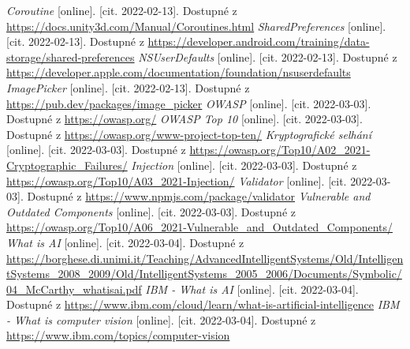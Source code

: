 \begin{thebibliography}{99}
     \textit{Coroutine} [online]. [cit. 2022-02-13]. Dostupné z \url{https://docs.unity3d.com/Manual/Coroutines.html}
     \textit{SharedPreferences} [online]. [cit. 2022-02-13]. Dostupné z \url{https://developer.android.com/training/data-storage/shared-preferences}
     \textit{NSUserDefaults} [online]. [cit. 2022-02-13]. Dostupné z \url{https://developer.apple.com/documentation/foundation/nsuserdefaults}
     \textit{ImagePicker} [online]. [cit. 2022-02-13]. Dostupné z \url{https://pub.dev/packages/image_picker}
     \textit{OWASP} [online]. [cit. 2022-03-03]. Dostupné z \url{https://owasp.org/}
     \textit{OWASP Top 10} [online]. [cit. 2022-03-03]. Dostupné z \url{https://owasp.org/www-project-top-ten/}
     \textit{Kryptografické selhání} [online]. [cit. 2022-03-03]. Dostupné z \url{https://owasp.org/Top10/A02_2021-Cryptographic_Failures/}
     \textit{Injection} [online]. [cit. 2022-03-03]. Dostupné z \url{https://owasp.org/Top10/A03_2021-Injection/}
     \textit{Validator} [online]. [cit. 2022-03-03]. Dostupné z \url{https://www.npmjs.com/package/validator}
     \textit{Vulnerable and Outdated Components} [online]. [cit. 2022-03-03]. Dostupné z \url{https://owasp.org/Top10/A06_2021-Vulnerable_and_Outdated_Components/}
     \textit{What is AI} [online]. [cit. 2022-03-04]. Dostupné z \url{https://borghese.di.unimi.it/Teaching/AdvancedIntelligentSystems/Old/IntelligentSystems_2008_2009/Old/IntelligentSystems_2005_2006/Documents/Symbolic/04_McCarthy_whatisai.pdf}
     \textit{IBM - What is AI} [online]. [cit. 2022-03-04]. Dostupné z \url{https://www.ibm.com/cloud/learn/what-is-artificial-intelligence}
     \textit{IBM - What is computer vision} [online]. [cit. 2022-03-04]. Dostupné z \url{https://www.ibm.com/topics/computer-vision}
\end{thebibliography}
